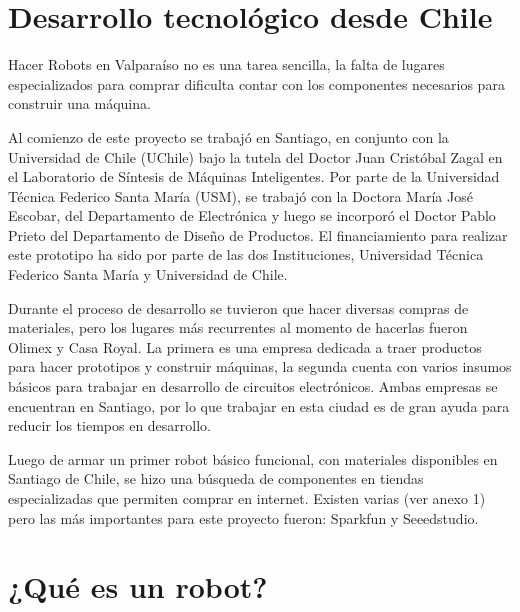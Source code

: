 
\section{Desarrollo tecnológico desde Chile}

Hacer Robots en Valparaíso no es una tarea sencilla, la falta de lugares especializados para comprar dificulta contar con los componentes necesarios para construir una máquina.

Al comienzo de este proyecto se trabajó en Santiago, en conjunto con la Universidad de Chile (UChile) bajo la tutela del Doctor Juan Cristóbal Zagal en el Laboratorio de Síntesis de Máquinas Inteligentes. Por parte de la Universidad Técnica Federico Santa María (USM), se trabajó con la Doctora María José Escobar, del Departamento de Electrónica y luego se incorporó el Doctor Pablo Prieto del Departamento de Diseño de Productos. El financiamiento para realizar este prototipo ha sido por parte de las dos Instituciones, Universidad Técnica Federico Santa María y Universidad de Chile.

Durante el proceso de desarrollo se tuvieron que hacer diversas compras de materiales, pero los lugares más recurrentes al momento de hacerlas fueron Olimex y Casa Royal. La primera es una empresa dedicada a traer productos para hacer prototipos y construir máquinas, la segunda cuenta con varios insumos básicos para trabajar en desarrollo de circuitos electrónicos. Ambas empresas se encuentran en Santiago, por lo que trabajar en esta ciudad es de gran ayuda para reducir los tiempos en desarrollo.

Luego de armar un primer robot básico funcional, con materiales disponibles en Santiago de Chile, se hizo una búsqueda de componentes en tiendas especializadas que permiten comprar en internet. Existen varias (ver anexo 1) pero las más importantes para este proyecto fueron: Sparkfun y Seeedstudio.





\section{¿Qué es un robot?}

